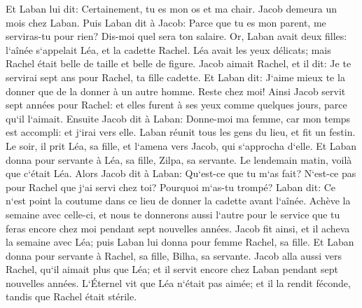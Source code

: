 \verse Et Laban lui dit: Certainement, tu es mon os et ma chair. Jacob demeura un mois chez Laban. 
\verse Puis Laban dit à Jacob: Parce que tu es mon parent, me serviras-tu pour rien? Dis-moi quel sera ton salaire. 
\verse Or, Laban avait deux filles: l`aînée s`appelait Léa, et la cadette Rachel. 
\verse Léa avait les yeux délicats; mais Rachel était belle de taille et belle de figure. 
\verse Jacob aimait Rachel, et il dit: Je te servirai sept ans pour Rachel, ta fille cadette. 
\verse Et Laban dit: J`aime mieux te la donner que de la donner à un autre homme. Reste chez moi! 
\verse Ainsi Jacob servit sept années pour Rachel: et elles furent à ses yeux comme quelques jours, parce qu`il l`aimait. 
\verse Ensuite Jacob dit à Laban: Donne-moi ma femme, car mon temps est accompli: et j`irai vers elle. 
\verse Laban réunit tous les gens du lieu, et fit un festin. 
\verse Le soir, il prit Léa, sa fille, et l`amena vers Jacob, qui s`approcha d`elle. 
\verse Et Laban donna pour servante à Léa, sa fille, Zilpa, sa servante. 
\verse Le lendemain matin, voilà que c`était Léa. Alors Jacob dit à Laban: Qu`est-ce que tu m`as fait? N`est-ce pas pour Rachel que j`ai servi chez toi? Pourquoi m`as-tu trompé? 
\verse Laban dit: Ce n`est point la coutume dans ce lieu de donner la cadette avant l`aînée. 
\verse Achève la semaine avec celle-ci, et nous te donnerons aussi l`autre pour le service que tu feras encore chez moi pendant sept nouvelles années. 
\verse Jacob fit ainsi, et il acheva la semaine avec Léa; puis Laban lui donna pour femme Rachel, sa fille. 
\verse Et Laban donna pour servante à Rachel, sa fille, Bilha, sa servante. 
\verse Jacob alla aussi vers Rachel, qu`il aimait plus que Léa; et il servit encore chez Laban pendant sept nouvelles années. 
\verse L`Éternel vit que Léa n`était pas aimée; et il la rendit féconde, tandis que Rachel était stérile. 
